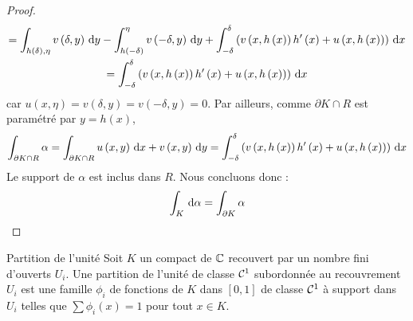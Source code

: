 \documentclass{cours}
\begin{document}
\begin{proof}
\begin{gather*}
        = \int_{h\left(\delta\right), \eta}v\left(\delta, y\right){\rm \, d} y - \int_{h\left(-\delta\right)}^{\eta} v\left(-\delta, y\right){\rm \, d} y + \int_{-\delta}^{\delta} \left(v\left(x, h\left(x\right)\right)h'\left(x\right) + u\left(x, h\left(x\right)\right)\right){\rm \, d} x\\
        = \int_{-\delta}^{\delta} \left(v\left(x, h\left(x\right)\right)h'\left(x\right) + u\left(x, h\left(x\right)\right)\right){\rm \, d} x
    \end{gather*}
    car $u\left(x, \eta\right) = v\left(\delta, y\right) = v\left(-\delta, y\right) = 0$. Par ailleurs, comme $\partial K \cap R$ est paramétré par $y = h\left(x\right)$,
    \begin{equation*}
        \int_{\partial{K}\cap R}\alpha = \int_{\partial K \cap R} u\left(x, y\right){\rm \, d} x + v\left(x, y\right){\rm \, d} y = \int_{- \delta}^{\delta} \left(v\left(x, h\left(x\right)\right)h'\left(x\right) + u\left(x, h\left(x\right)\right)\right){\rm \, d} x
    \end{equation*}
    Le support de $\alpha$ est inclus dans $R$. Nous concluons donc :
    \begin{equation*}
        \int_{K}{\rm \, d} \alpha = \int_{\partial K} \alpha 
    \end{equation*}
\end{proof}

\begin{définition}{Partition de l'unité}{}
    Soit $K$ un compact de $\mathbb{C}$ recouvert par un nombre fini d'ouverts $U_{i}$. Une partition de l'unité de classe $\mathcal{C}^{1}$ subordonnée au recouvrement $U_{i}$ est une famille $\phi_{i}$ de fonctions de $K$ dans $\left[0, 1\right]$ de classe $\mathcal{C}^{1}$ à support dans $U_{i}$ telles que $\sum \phi_{i}\left(x\right) = 1$ pour tout $x \in K$. 
\end{définition}
\end{document}
